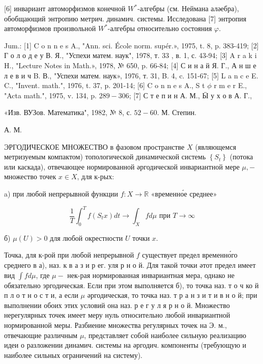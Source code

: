 \documentclass[10pt]{article}
\begin{document}
[6] инвариант автоморфизмов конечной $W^{*}$-алгебры (см. Неймана аләебра), обобщающий энтропию метрич. динамич. системы. Исследована [7] энтропия автоморфизмов произвольной $W^{*}$-алгебры относительно состояния $\varphi$.



Jum.: [1] C o n n e s A., "Ann. sci. École norm. supér.», 1975, t. 8, p. 383-419; [2] Г о л о д е у В. Я., "Успехи матем. наук", 1978, т. 33 , в. 1, с. 43-94; [3] A r a k i H., "Lecture Notes in Math.», 1978, № 650, p. 66-84; [4] С и н а й Я. Г., А н ш е л е в и ч B. В., "Успехи матем. наук», 1976, т. 31, B. 4, c. 151-67; [5] L a n c e E. C., "Invent. math.", 1976, t. 37, p. 201-14; [6] C o n n e s A., S t $\phi$ r m e r E., "Acta math.", 1975, v. 134, p. $289-306$; [7] С т е п и н А. М., Ӹ у х о в А. Г.,

«Изв. ВУЗов. Математика", 1982, № 8, с. $52-60$. М. Степин.

А. М.



ЭРГОДИЧЕСКОЕ МНОЖЕСТВО в фазовом пространстве $X$ (являющемся метризуемым компактом) топологической динамической системь $\left\{S_{t}\right\}$ (потока или каскада), отвечающее нормированной әргодической инвариантной мере $\mu,-$ множество точек $x \in X$, для к-рых:



a) при любой непрерывной функции $f: X \rightarrow \mathbb{R}$ «временно́е среднее»



\[

\frac{1}{T} \int_{0}^{T} f\left(S_{t} x\right) d t \longrightarrow \int_{X} f d \mu \text { при } T \longrightarrow \infty

\]



б) $\mu(U)>0$ для любой окрестности $U$ точки $x$.



Точка, для к-рой при любой непрерывной $f$ существует предел временно́го среднего в а), наз. к в а з и р ег. уля р н о й. Для такой точки әтот предел имеет вид $\int f d \mu$, где $\mu-$ нек-рая нормированная инвариантная мера, однако не обязательно эргодическая. Если при этом выполняется б), то точка наз. т о ч ко й п л о т н о с т и, а если $\mu$ әргодическая, то точка наз. т р а н з и т и в н о й; при выполнении обоих этих условий она наз. р е г у л я р н о й. Множество нерегулярных точек имеет меру нуль относительно любой инвариантной нормированной меры. Разбиение множества регулярных точек на Э. м., отвечающие различным $\mu$, представляет собой наиболее сильную реализацию идеи о разложении динамич. системы на әргодич. компоненты (требующую и наиболее сильных ограничений на систему).
\end{document}
